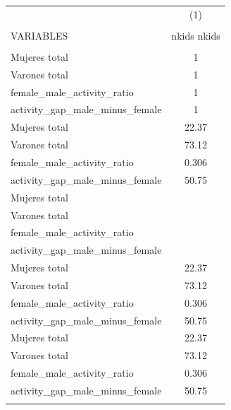 \begin{tabular}{lc} \hline
 & (1) \\
 &  \\
VARIABLES & nkids nkids \\ \hline
 &  \\
Mujeres total & 1 \\
Varones total & 1 \\
female\_male\_activity\_ratio & 1 \\
activity\_gap\_male\_minus\_female & 1 \\
Mujeres total & 22.37 \\
Varones total & 73.12 \\
female\_male\_activity\_ratio & 0.306 \\
activity\_gap\_male\_minus\_female & 50.75 \\
Mujeres total &  \\
Varones total &  \\
female\_male\_activity\_ratio &  \\
activity\_gap\_male\_minus\_female &  \\
Mujeres total & 22.37 \\
Varones total & 73.12 \\
female\_male\_activity\_ratio & 0.306 \\
activity\_gap\_male\_minus\_female & 50.75 \\
Mujeres total & 22.37 \\
Varones total & 73.12 \\
female\_male\_activity\_ratio & 0.306 \\
activity\_gap\_male\_minus\_female & 50.75 \\
 &  \\ \hline
\end{tabular}
